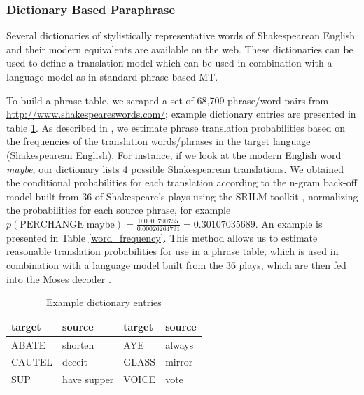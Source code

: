\documentclass[10pt,a5paper,twoside]{article}
\begin{document}
\subsubsection{Dictionary Based Paraphrase}
\label{dictionary_baseline}
Several dictionaries of stylistically representative words of Shakespearean English and their modern equivalents are available on the web.  
These dictionaries can be used to define a translation model which can be used in combination with a language model as in standard phrase-based MT.


To build a phrase table, we scraped a set of 68,709 phrase/word pairs from \url{http://www.shakespeareswords.com/}; 
example dictionary entries are presented in table \ref{dictionary_example}. 
As described in \cite{Koehn00}, we estimate phrase translation probabilities
based on the frequencies of the translation words/phrases in the target language (Shakespearean English).
For instance, if we look at the modern English word \emph{maybe}, our dictionary lists 4 possible Shakespearean translations. 
We obtained the conditional probabilities for each translation according to the n-gram back-off model built from 36 of Shakespeare's 
plays using the SRILM toolkit \cite{Stolcke02}, 
normalizing the probabilities for each source phrase, for example $p(\text{PERCHANGE}|\text{maybe}) = \frac{0.0000790755}{0.00026264791} = 0.30107035689$.
An example is presented in Table \ref{word_frequency}.
This method allows us to estimate reasonable translation probabilities for use in a phrase table, which is used in combination 
with a language model built from the 36 plays, which are then fed into the Moses decoder \cite{Koehn07}.

\begin{table}
  \begin{center}
  \begin{tabular}{|l|l||l|l|}
    \hline
    target & source & target & source \\
    \hline
    \hline
    ABATE & shorten & AYE & always \\
    \hline
    CAUTEL & deceit & GLASS & mirror \\
    \hline
    SUP & have supper & VOICE & vote \\
    \hline
  \end{tabular}
  \end{center}
  \caption{Example dictionary entries}
  \label{dictionary_example}
\end{table}
\end{document}
